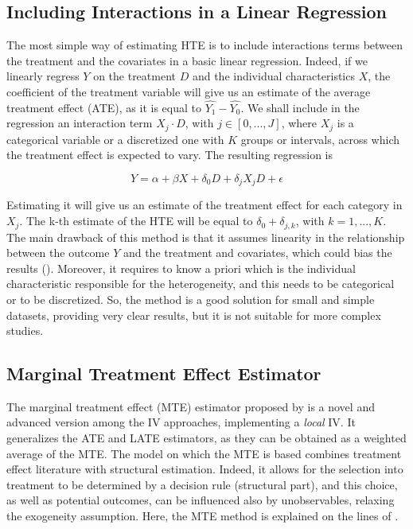 \documentclass[12pt,a4paper,openright,twoside]{book}
\begin{document}
\begin{doublespacing}
\subsection{Including Interactions in a Linear Regression} \label{interact}
The most simple way of estimating HTE is to include interactions terms between the treatment and the covariates in a basic linear regression. Indeed, if we linearly regress $Y$ on the treatment $D$ and the individual characteristics $X$, the coefficient of the treatment variable will give us an estimate of the average treatment effect (ATE), as it is equal to $ \hat{Y_1} - \hat{Y_0}$. 
We shall include in the regression an interaction term $X_j \cdot D$, with $j \in [0, ..., J]$, where $X_j$ is a categorical variable or a discretized one with $K$ groups or intervals, across which the treatment effect is expected to vary. The resulting regression is

\[
Y = \alpha + \beta X + \delta{_0} D + \delta{_j} X_j D + \epsilon
\]

Estimating it will give us an estimate of the treatment effect for each category in $X_j$. The k-th  estimate of the HTE will be equal to $\delta{_0} + \delta{_{j,k}} $, with $k = 1,..., K$. \\

The main drawback of this method is that it assumes linearity in the relationship between the outcome $Y$ and the treatment and covariates, which could bias the results (\citealp{zhouxie2020heterogeneous}). Moreover, it requires to know a priori which is the individual characteristic responsible for the heterogeneity, and this needs to be categorical or to be discretized. So, the method is a good solution for small and simple datasets, providing very clear results, but it is not suitable for more complex studies. 


\subsection{Marginal Treatment Effect Estimator} \label{mte}
The marginal treatment effect (MTE) estimator proposed by \citet{heckman2005structural} is a novel and advanced version among the IV approaches, implementing a \textit{local} IV. It generalizes the ATE and LATE estimators, as they can be obtained as a weighted average of the MTE.
The model on which the MTE is based combines treatment effect literature with structural estimation. Indeed, it allows for the selection into treatment to be determined by a decision rule (structural part), and this choice, as well as potential outcomes, can be influenced also by unobservables, relaxing the exogeneity assumption.
Here, the MTE method is explained on the lines of \citet{carneiro2011estimating}. \\


\end{doublespacing}
\end{document}
